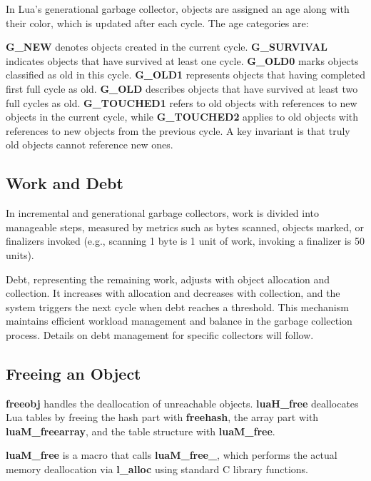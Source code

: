 \documentclass[10pt]{article}
\begin{document}
In Lua's generational garbage collector, objects are assigned an age along with their color, which is updated after each cycle. The age categories are:

\textbf{G\_NEW} denotes objects created in the current cycle. \textbf{G\_SURVIVAL} indicates objects that have survived at least one cycle. \textbf{G\_OLD0} marks objects classified as old in this cycle. \textbf{G\_OLD1} represents objects that having completed first full cycle as old. \textbf{G\_OLD} describes objects that have survived at least two full cycles as old. \textbf{G\_TOUCHED1} refers to old objects with references to new objects in the current cycle, while \textbf{G\_TOUCHED2} applies to old objects with references to new objects from the previous cycle. A key invariant is that truly old objects cannot reference new ones.
\
\subsection{Work and Debt} \label{sec:debt_and_work}

In incremental and generational garbage collectors, work is divided into manageable steps, measured by metrics such as bytes scanned, objects marked, or finalizers invoked (e.g., scanning 1 byte is 1 unit of work, invoking a finalizer is 50 units). 

Debt, representing the remaining work, adjusts with object allocation and collection. It increases with allocation and decreases with collection, and the system triggers the next cycle when debt reaches a threshold. This mechanism maintains efficient workload management and balance in the garbage collection process. Details on debt management for specific collectors will follow.



\subsection{Freeing an Object} \label{sec:freeing_object}

\textbf{freeobj} handles the deallocation of unreachable objects. \textbf{luaH\_free} deallocates Lua tables by freeing the hash part with \textbf{freehash}, the array part with \textbf{luaM\_freearray}, and the table structure with \textbf{luaM\_free}. 

\textbf{luaM\_free} is a macro that calls \textbf{luaM\_free\_}, which performs the actual memory deallocation via \textbf{l\_alloc} using standard C library functions.
\end{document}
